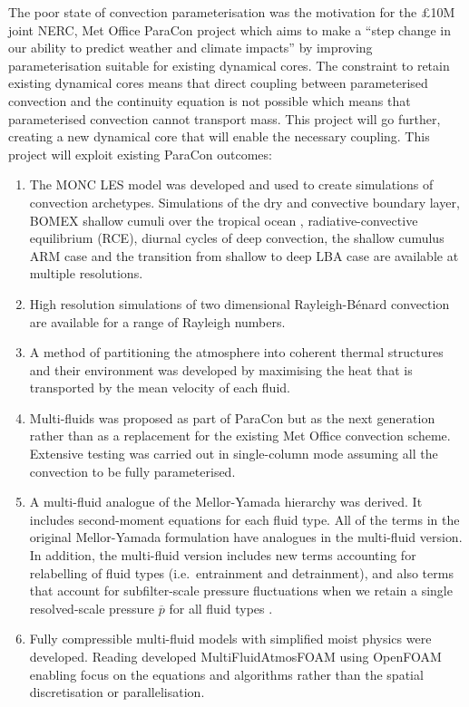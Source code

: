 \documentclass[11pt,a4paper]{article}
\begin{document}
The poor state of convection parameterisation was the motivation for the \pounds 10M joint NERC, Met Office ParaCon project which aims to make a ``step change in our ability to predict weather and climate impacts'' by improving parameterisation suitable for existing dynamical cores. The constraint to retain existing dynamical cores means that direct coupling between parameterised convection and the continuity equation is not possible which means that parameterised convection cannot transport mass. This project will go further, creating a new dynamical core that will enable the necessary coupling. This project will exploit existing ParaCon outcomes:
\begin{enumerate}
\item The MONC LES model was developed and used to create simulations of convection archetypes. Simulations of the dry and convective boundary layer, BOMEX shallow cumuli over the tropical ocean \cite[]{HR73}, radiative-convective equilibrium (RCE), diurnal cycles of deep convection, the shallow cumulus ARM case \cite[]{BCC+02} and the transition from shallow to deep LBA case \cite[]{BFGB02} are available at multiple resolutions.

\item High resolution simulations of two dimensional Rayleigh-B\'enard convection are available for a range of Rayleigh numbers.

\item A method of partitioning the atmosphere into coherent thermal structures and their environment was developed \cite[]{ETB20} by maximising the heat that is transported by the mean velocity of each fluid.

\item Multi-fluids was proposed as part of ParaCon but as the next generation rather than as a replacement for the existing Met Office convection scheme. Extensive testing was carried out in single-column mode \cite[]{TEB19,WMS20} assuming all the convection to be fully parameterised.

\item A multi-fluid analogue of the Mellor-Yamada hierarchy was derived. It includes second-moment equations for each fluid type. All of the terms in the original Mellor-Yamada formulation have analogues in the multi-fluid version. In addition, the multi-fluid version includes new terms accounting for relabelling of fluid types (i.e.\ entrainment and detrainment), and also terms that account for subfilter-scale pressure fluctuations when we retain a single resolved-scale pressure $\overline{p}$ for all fluid types \citep{TWV+18}.

\item Fully compressible multi-fluid models with simplified moist physics were developed. Reading developed MultiFluidAtmosFOAM using OpenFOAM enabling focus on the equations and algorithms rather than the spatial discretisation or parallelisation.

\end{enumerate}
\end{document}
